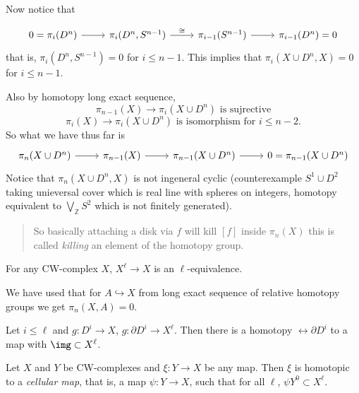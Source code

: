 Now notice that

$$\begin{tikzcd}
	0=\pi_i(D^n)\arrow[r]&\pi_i(D^n,S^{n-1})\arrow[r,"\cong"]&\pi_{i-1}(S^{n-1})\arrow[r]&\pi_{i-1}(D^n)=0
\end{tikzcd}$$
that is, $\pi_i(D^n,S^{n-1})=0$ for $i\leq n-1$. This implies that $\pi_i(X\cup D^n,X)=0$ for $i\leq n-1$.

Also by homotopy long exact sequence,
$$\pi_{n-1}(X)\to \pi_i(X\cup D^n)\text{ is sujrective}$$
$$\pi_i(X)\to \pi_{i}(X\cup D^n)\text{ is isomorphism for }i\leq n-2.$$
So what we have thus far is
$$\begin{tikzcd}
	\pi_n(X\cup D^n)\arrow[r]&\pi_{n-1}(X)\arrow[r]&\pi_{n-1}(X\cup D^n)\arrow[r]&0=\pi_{n-1}(X\cup D^n)
\end{tikzcd}$$
Notice that $\pi_n(X\cup D^n,X)$ is not ingeneral cyclic (counterexample $S^1\cup D^2$ taking unieversal cover which is real line with spheres on integers, homotopy equivalent to $\bigvee_\mathbb{Z} S^2$ which is not finitely generated).

\begin{quote}
	{\color{red} So basically attaching a disk via $f$ will kill $[f]$ inside $\pi_n(X)$ this is called {\it killing} an element of the homotopy group.}
\end{quote}

\begin{proposition}
	For any CW-complex $X$, $X^\ell\to X$ is an $\ell$-equivalence.
\end{proposition}

\begin{remark}
	We have used that for $A\hookrightarrow X$ from long exact sequence of relative homotopy groups we get $\pi_n(X,A)=0$.
\end{remark}

\begin{lemma}
	Let $i\leq \ell$ and $g: D^i\to X$, $g:\partial D^i\to X^\ell$. Then there is a homotopy $\rel\partial D^i$ to a map with $\img\subset X^\ell$.
\end{lemma}

\begin{theorem}
	Let $X$ and $Y$ be CW-complexes and $\xi:Y\to X$ be any map. Then $\xi$ is homotopic to a {\it cellular map}, that is, a map $\psi:Y\to X$, such that for all $\ell$, $\psi Y^0\subset X^\ell$.
\end{theorem}

